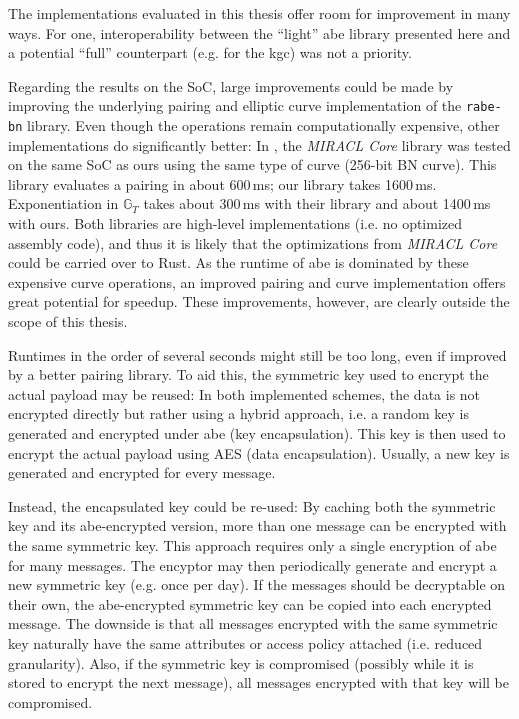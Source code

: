 The implementations evaluated in this thesis offer room for improvement in many ways.
For one, interoperability between the ``light'' \acrshort{abe} library presented here and a potential ``full'' counterpart (e.g. for the \acrshort{kgc}) was not a priority.

Regarding the results on the SoC, large improvements could be made by improving the underlying pairing and elliptic curve implementation of the \texttt{rabe-bn} library.
Even though the operations remain computationally expensive, other implementations do significantly better:
In \cite{scott_deployment_2020}, the \emph{MIRACL Core} library was tested on the same SoC as ours using the same type of curve (256-bit BN curve).
This library evaluates a pairing in about 600\,ms; our library takes 1600\,ms. 
Exponentiation in $\mathbb{G}_T$ takes about 300\,ms with their library and about 1400\,ms with ours. 
Both libraries are high-level implementations (i.e. no optimized assembly code), and thus it is likely that the optimizations from \emph{MIRACL Core} could be carried over to Rust.
As the runtime of \acrshort{abe} is dominated by these expensive curve operations, an improved pairing and curve implementation offers great potential for speedup.
These improvements, however, are clearly outside the scope of this thesis.

Runtimes in the order of several seconds might still be too long, even if improved by a better pairing library.
To aid this, the symmetric key used to encrypt the actual payload may be reused:
In both implemented schemes, the data is not encrypted directly but rather using a hybrid approach, i.e. a random key is generated and encrypted under \acrshort{abe} (key encapsulation).
This key is then used to encrypt the actual payload using AES (data encapsulation).
Usually, a new key is generated and encrypted for every message.

Instead, the encapsulated key could be re-used:
By caching both the symmetric key and its \acrshort{abe}-encrypted version, more than one message can be encrypted with the same symmetric key.
This approach requires only a single encryption of \acrshort{abe} for many messages.
The encyptor may then periodically generate and encrypt a new symmetric key (e.g. once per day).
If the messages should be decryptable on their own, the \acrshort{abe}-encrypted symmetric key can be copied into each encrypted message.
The downside is that all messages encrypted with the same symmetric key naturally have the same attributes or access policy attached (i.e. reduced granularity).
Also, if the symmetric key is compromised (possibly while it is stored to encrypt the next message), all messages encrypted with that key will be compromised.


